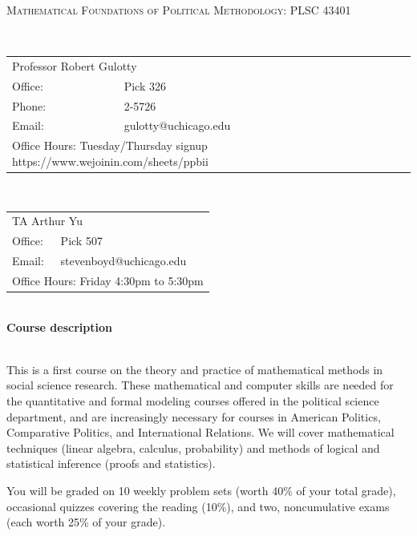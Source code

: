 \documentclass[11pt]{article}
\begin{document}
\begin{center}

\large
\textsc{Mathematical Foundations of Political Methodology: PLSC 43401}\\
\end{center}

\small

\ \\ \begin{tabular} {ll} \multicolumn{2}{l}{Professor Robert Gulotty}\\
Office: &Pick 326\\
Phone: &2-5726\\
Email: &gulotty@uchicago.edu\\
\multicolumn{2}{l}{Office Hours: Tuesday/Thursday signup https://www.wejoinin.com/sheets/ppbii}
\end{tabular}

\vspace{.15in}
\vspace{.15in}

\ \\ \begin{tabular} {ll} \multicolumn{2}{l}{TA Arthur Yu}\\
Office: & Pick 507 \\
Email: &stevenboyd@uchicago.edu  \\
\multicolumn{2}{l}{Office Hours: Friday 4:30pm to 5:30pm}
\end{tabular}

\vspace{.5in}

\ \\{\bf Course description}  

\ \\This is a first course on the theory and practice of mathematical methods in social science research.  These mathematical and computer skills are needed for the quantitative and formal modeling courses offered in the political science department, and are increasingly necessary for courses in American Politics, Comparative Politics, and International Relations.   We will cover mathematical techniques (linear algebra, calculus, probability) and methods of logical and statistical inference (proofs and statistics).  

\vspace{.1in}

 You will be graded on 10 weekly problem sets (worth 40\% of your total grade), occasional quizzes covering the reading (10\%), and two, noncumulative exams (each worth 25\% of your grade).  
\end{document}
